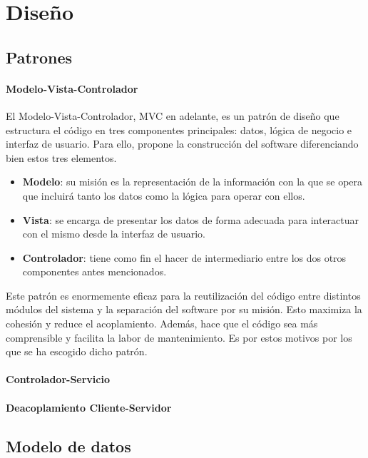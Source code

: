 
\chapter{Diseño}\label{diseno}
\section{Patrones}\label{sec:patrones}

\subsubsection{Modelo-Vista-Controlador}
El Modelo-Vista-Controlador, MVC en adelante, es un patrón de diseño que estructura el código en tres componentes principales: datos, lógica de negocio e interfaz de usuario. Para ello, propone la construcción del software diferenciando bien estos tres elementos.

\begin{itemize}
    \item \textbf{Modelo}: su misión es la representación de la información con la que se opera que incluirá tanto los datos como la lógica para operar con ellos.
    \item \textbf{Vista}: se encarga de presentar los datos de forma adecuada para interactuar con el mismo desde la interfaz de usuario.
    \item \textbf{Controlador}: tiene como fin el hacer de intermediario entre los dos otros componentes antes mencionados.
\end{itemize}

Este patrón es enormemente eficaz para la reutilización del código entre distintos módulos del sistema y la separación del software por su misión. Esto maximiza la cohesión y reduce el acoplamiento. Además, hace que el código sea más comprensible y facilita la labor de mantenimiento. Es por estos motivos por los que se ha escogido dicho patrón.

\subsubsection{Controlador-Servicio}

\subsubsection{Deacoplamiento Cliente-Servidor}

\section{Modelo de datos}\label{sec:modelo_datos}

